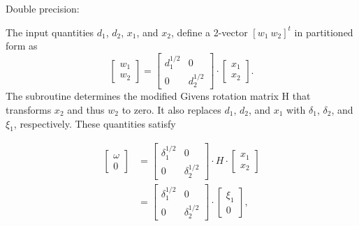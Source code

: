 \documentclass[twoside]{MATH77}
\begin{document}
\begin{center}
\end{center}

Double precision:

\begin{center}
\end{center}

The input quantities $d_1$, $d_2$, $x_1$, and $x_2$, define a
2-vector $[w_1\ w_2]^t$ in partitioned form as%
\begin{equation*}
\left[
\begin{array}{c}
w_1 \\
w_2
\end{array}
\right] =\left[
\begin{array}{cc}
d_1^{1/2} & 0 \\
0 & d_2^{1/2}
\end{array}
\right] \cdot \left[
\begin{array}{c}
x_1 \\
x_2
\end{array}
\right] .
\end{equation*}
The subroutine determines the modified Givens rotation matrix H that
transforms $x_2$ and thus $w_2$ to zero. It also replaces $d_1$, $d_2$, and $x_1$
with $\delta _1$, $\delta _2$, and $\xi _1$, respectively. These quantities
satisfy

\begin{align*}
\left[ \begin{array}{c} \omega  \\ 0 \end{array}
\right] &= \left[ \begin{array}{cc}
\delta _1^{1/2} & 0 \\ 0 & \delta _2^{1/2} \end{array} \right]
\cdot H\cdot \left[ \begin{array}{c} x_1 \\ x_2 \end{array} \right] \\
 &=\left[ \begin{array}{cc}
\delta _1^{1/2} & 0 \\ 0 & \delta _2^{1/2}
\end{array} \right]
\cdot \left[ \begin{array}{c} \xi _1 \\ 0
\end{array} \right] ,
\end{align*}
\end{document}
